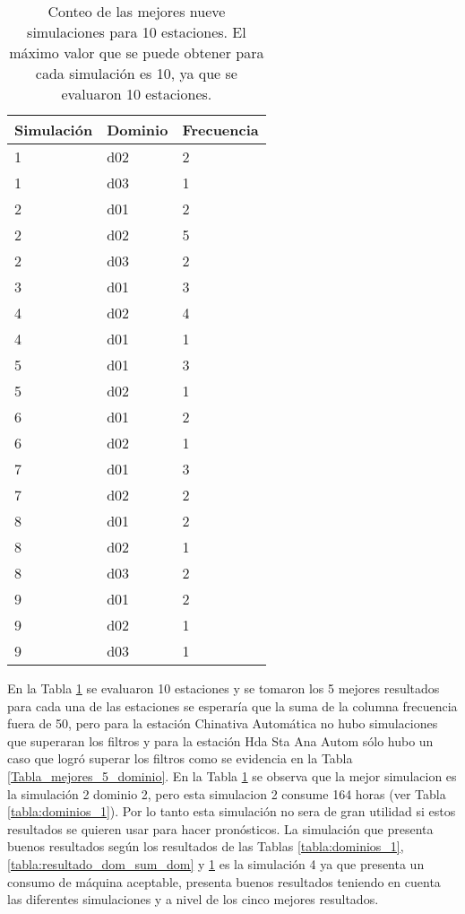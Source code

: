 \begin{table}[H] %
\centering
\caption{Conteo de las mejores nueve simulaciones para 10 estaciones. El máximo valor que se puede obtener para cada simulación es 10, ya que se evaluaron 10 estaciones.}
\begin{tabular}{lll}
Simulación & Dominio & Frecuencia \\ \hline
1   &  d02 &  2 \\
1   &  d03 &  1 \\
2   &  d01 &  2 \\
2   &  d02 &  5 \\
2   &  d03 &  2 \\
3   &  d01 &  3 \\
4   &  d02 &  4 \\
4   &  d01 &  1 \\
5   &  d01 &  3 \\
5   &  d02 &  1 \\
6   &  d01 &  2 \\
6   &  d02 &  1 \\
7   &  d01 &  3 \\
7   &  d02 &  2 \\
8   &  d01 &  2 \\
8   &  d02 &  1 \\
8   &  d03 &  2 \\
9   &  d01 &  2 \\
9   &  d02 &  1 \\
9   &  d03 &  1 \\


\end{tabular}
\label{Tabla_resum_dom}
\end{table}

En la Tabla \ref{Tabla_resum_dom} se evaluaron 10 estaciones y se tomaron los 5 mejores resultados para cada una de las estaciones se esperaría que la suma de la columna frecuencia fuera de 50, pero para la estación Chinativa Automática no hubo simulaciones que superaran los filtros y para la estación Hda Sta Ana Autom sólo hubo un caso que logró superar los filtros como se evidencia en la Tabla \ref{Tabla_mejores_5_dominio}. En la Tabla \ref{Tabla_resum_dom} se observa que la mejor simulacion es la simulación 2 dominio 2, pero esta simulacion 2 consume 164 horas (ver Tabla \ref{tabla:dominios_1}). Por lo tanto esta simulación no sera de gran utilidad si estos resultados se quieren usar para hacer pronósticos. La simulación que presenta buenos resultados según los resultados de las Tablas \ref{tabla:dominios_1}, \ref{tabla:resultado_dom_sum_dom} y \ref{Tabla_resum_dom} es la simulación 4 ya que presenta un consumo de máquina aceptable, presenta buenos resultados teniendo en cuenta las diferentes simulaciones y a nivel de los cinco mejores resultados.\\


